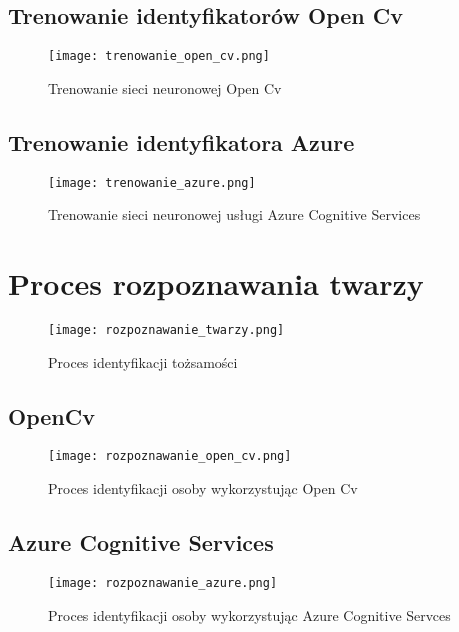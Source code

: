 \subsection{Trenowanie identyfikatorów Open Cv} \label{trenowanie_open_cv}

\begin{figure}[H]
	\centering
	\texttt{[image: trenowanie\_open\_cv.png]}
	\caption{Trenowanie sieci neuronowej Open Cv}
	\label{fig:trenowanie_open_cv}
\end{figure}

\subsection{Trenowanie identyfikatora Azure} \label{trenowanie_open_cv}
\begin{figure}[H]
	\centering
	\texttt{[image: trenowanie\_azure.png]}
	\caption{Trenowanie sieci neuronowej usługi Azure Cognitive Services}
	\label{fig:trenowanie_azure}
\end{figure}

\section{Proces rozpoznawania twarzy}
\begin{figure}[H]
	\centering
	\texttt{[image: rozpoznawanie\_twarzy.png]}
	\caption{Proces identyfikacji tożsamości}
	\label{fig:rozpoznawanie_proces}
\end{figure}

\subsection{OpenCv}
\begin{figure}[H]
	\centering
	\texttt{[image: rozpoznawanie\_open\_cv.png]}
	\caption{Proces identyfikacji osoby wykorzystując Open Cv}
	\label{fig:rozpoznawanie_open_cv}
\end{figure}

\subsection{Azure Cognitive Services}
\begin{figure}[H]
	\centering
	\texttt{[image: rozpoznawanie\_azure.png]}
	\caption{Proces identyfikacji osoby wykorzystując Azure Cognitive Servces}
	\label{fig:rozpoznawanie_open_cv}
\end{figure}
